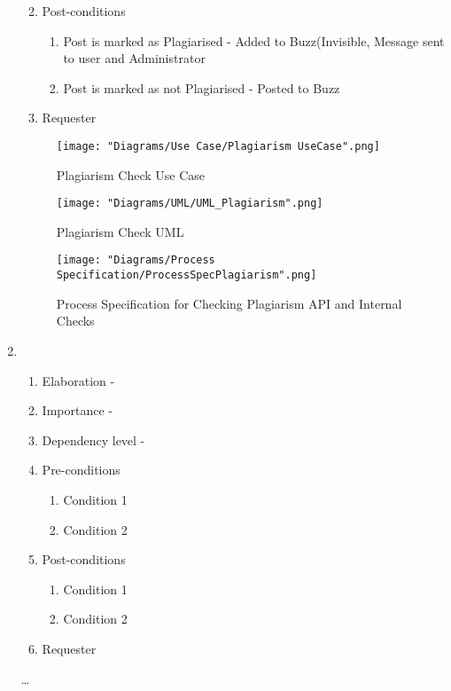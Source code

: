 \documentclass[12pt]{article}
\begin{document}
\begin{enumerate}
\begin{enumerate}
\begin{enumerate}
    \end{enumerate}
        \item Post-conditions
    \begin{enumerate}
    	\item Post is marked as Plagiarised - Added to Buzz(Invisible, Message sent to user and Administrator
    	\item Post is marked as not Plagiarised - Posted to Buzz
    \end{enumerate}
    \item Requester
  \end{enumerate}
\begin{figure}[h]
	\centering
	\texttt{[image: "Diagrams/Use Case/Plagiarism UseCase".png]}
	\caption{Plagiarism Check Use Case}
\end{figure}
\begin{figure}[h]
	\centering
	\texttt{[image: "Diagrams/UML/UML\_Plagiarism".png]}
	\caption{Plagiarism Check UML}
\end{figure}
\begin{figure}[h]
	\centering
	\texttt{[image: "Diagrams/Process Specification/ProcessSpecPlagiarism".png]}
	\caption{Process Specification for Checking Plagiarism API and Internal Checks}
\end{figure}
\clearpage %
   \item  %
  \begin{enumerate}
    \item Elaboration - 
    \item Importance - 
    \item Dependency level - 
    \item Pre-conditions
    \begin{enumerate}
    	\item Condition 1
    	\item Condition 2
    \end{enumerate}
        \item Post-conditions
    \begin{enumerate}
    	\item Condition 1
    	\item Condition 2
    \end{enumerate}
    \item Requester
  \end{enumerate}
  \ldots
\end{enumerate}
\end{document}
